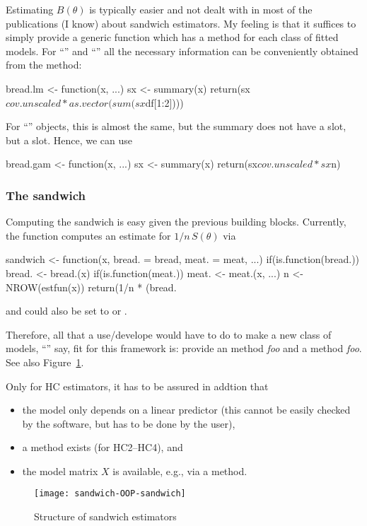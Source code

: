\documentclass{Z}
\begin{document}
Estimating $B(\theta)$ is typically easier and not dealt with in most of the publications
(I know) about sandwich estimators. My feeling is that it suffices to simply provide a 
generic function  which has a method for each class of fitted models.
For ``'' and ``'' all the necessary information can be conveniently
obtained from the  method:
\begin{Schunk}
\begin{Sinput}
bread.lm <- function(x, ...)
{
  sx <- summary(x)
  return(sx$cov.unscaled * as.vector(sum(sx$df[1:2])))
}
\end{Sinput}
\end{Schunk}
For ``'' objects, this is almost the same, but the summary does not have a
 slot, but a  slot. Hence, we can use
\begin{Schunk}
\begin{Sinput}
bread.gam <- function(x, ...)
{
  sx <- summary(x)
  return(sx$cov.unscaled * sx$n)
}
\end{Sinput}
\end{Schunk}


\subsubsection*{The sandwich}

Computing the sandwich is easy given the previous building blocks. Currently, the 
function  computes an estimate for $1/n \, S(\theta)$ via
\begin{Schunk}
\begin{Sinput}
sandwich <- function(x, bread. = bread, meat. = meat, ...)
{
  if(is.function(bread.)) bread. <- bread.(x)
  if(is.function(meat.)) meat. <- meat.(x, ...)
  n <- NROW(estfun(x))
  return(1/n * (bread. %*% meat. %*% bread.))
}
\end{Sinput}
\end{Schunk}
and  could also be set to  or . 

Therefore, all that a
use/develope would have to do to make a new class of models, 
``'' say, fit for this framework is: 
provide an  method \emph{foo}\code{()}
and a  method \emph{foo}\code{()}. See also Figure~\ref{fig:sandwich}.

Only for HC estimators, it has to be assured in addtion that 
\begin{itemize}
  \item the model only depends on a linear predictor (this cannot be easily
        checked by the software, but has to be done by the user),
  \item a  method exists (for HC2--HC4), and
  \item the model matrix $X$ is available, e.g., via a  method.
\end{itemize}

\begin{figure}[tbh]
\begin{center}
\texttt{[image: sandwich-OOP-sandwich]}
\caption{\label{fig:sandwich} Structure of sandwich estimators}
\end{center}
\end{figure}
\end{document}
